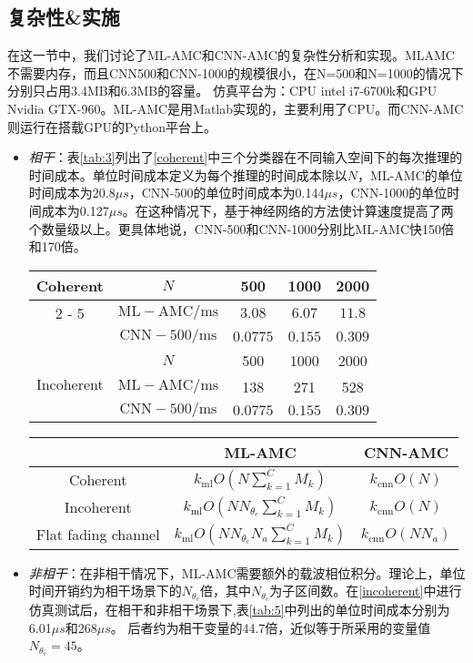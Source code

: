 \documentclass[final]{cvpr}
\begin{document}
\subsection{复杂性\&实施}\label{Compimple}

在这一节中，我们讨论了ML-AMC和CNN-AMC的复杂性分析和实现。MLAMC不需要内存，而且CNN500和CNN-1000的规模很小，在N=500和N=1000的情况下分别只占用3.4MB和6.3MB的容量。
仿真平台为：CPU intel i7-6700k和GPU Nvidia GTX-960。ML-AMC是用Matlab实现的，主要利用了CPU。而CNN-AMC则运行在搭载GPU的Python平台上。
\begin{itemize}
    \item \textit{相干}：表\ref{tab:3}列出了\ref{coherent}中三个分类器在不同输入空间下的每次推理的时间成本。单位时间成本定义为每个推理的时间成本除以$N$，ML-AMC的单位时间成本为20.8$\mu s$，CNN-500的单位时间成本为0.144$\mu s$，CNN-1000的单位时间成本为0.127$\mu s$。在这种情况下，基于神经网络的方法使计算速度提高了两个数量级以上。更具体地说，CNN-500和CNN-1000分别比ML-AMC快150倍和170倍。
    \begin{table*}[htbp]
\centering
\caption{四种调制方案分类的平均时间开销}
\begin{tabular}{c|c|c|c|c}
\hline \multirow{3}{*}{ Coherent } & $N$ & 500 & 1000 & 2000 \\
\cline { 2 - 5 } & $\mathrm{ML}-\mathrm{AMC} / \mathrm{ms}$ & $3.08$ & $6.07$ & $11.8$ \\
& $\mathrm{CNN}-500 / \mathrm{ms}$ & $0.0775$ & $0.155$ & $0.309$ \\
\hline \multirow{3}{*}{ Incoherent } & $N$ & 500 & 1000 & 2000 \\
\cline { 2 - 5 } & $\mathrm{ML}-\mathrm{AMC} / \mathrm{ms}$ & 138 & 271 & 528 \\
& $\mathrm{CNN}-500 / \mathrm{ms}$ & $0.0775$ & $0.155$ & $0.309$ \\
\hline
\end{tabular}\label{tab:4}
\end{table*}
    \begin{table*}[htbp]
\centering
\caption{四种调制方案分类的平均时间开销}
\begin{tabular}{c|c|c}
\hline & ML-AMC & CNN-AMC \\
\hline Coherent & $k_{\mathrm{ml}} O\left(N \sum_{k=1}^{C} M_{k}\right)$ & $k_{\mathrm{cnn}} O(N)$ \\
\hline Incoherent & $k_{\mathrm{ml}} O\left(N N_{\theta_{c}} \sum_{k=1}^{C} M_{k}\right)$ & $k_{\mathrm{cnn}} O(N)$ \\
\hline Flat fading channel & $k_{\mathrm{ml}} O\left(N N_{\theta_{c}} N_{a} \sum_{k=1}^{C} M_{k}\right)$ & $k_{\mathrm{cnn}} O\left(N N_{a}\right)$ \\
\hline
\end{tabular}\label{tab:5}
\end{table*}
\item \textit{非相干}：在非相干情况下，ML-AMC需要额外的载波相位积分。理论上，单位时间开销约为相干场景下的$N_{θ_c}$倍，其中$N_{θ_c}$为子区间数。在\ref{incoherent}中进行仿真测试后，在相干和非相干场景下,表\ref{tab:5}中列出的单位时间成本分别为6.01$\mu s$和268$\mu s$。
后者约为相干变量的44.7倍，近似等于所采用的变量值$N_{θ_c}=45$。


\end{itemize}
\end{document}
